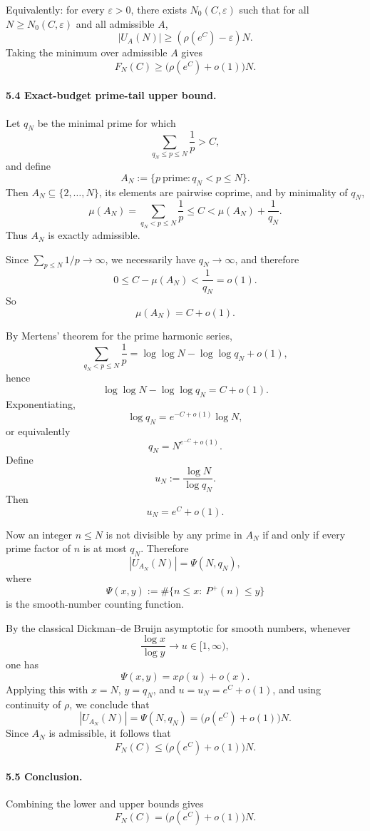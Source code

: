 Equivalently: for every \(\varepsilon>0\), there exists \(N_0(C,\varepsilon)\) such that for all \(N\ge N_0(C,\varepsilon)\) and all admissible \(A\),
\[
|U_A(N)|\ge (\rho(e^C)-\varepsilon)N.
\]
Taking the minimum over admissible \(A\) gives
\[
F_N(C)\ge \bigl(\rho(e^C)+o(1)\bigr)N.
\]

\paragraph{5.4 Exact-budget prime-tail upper bound.}

Let \(q_N\) be the minimal prime for which
\[
\sum_{q_N\le p\le N}\frac1p>C,
\]
and define
\[
A_N:=\{p\ \mbox{prime}: q_N<p\le N\}.
\]
Then \(A_N\subseteq\{2,\dots,N\}\), its elements are pairwise coprime, and by minimality of \(q_N\),
\[
\mu(A_N)=\sum_{q_N<p\le N}\frac1p\le C<\mu(A_N)+\frac1{q_N}.
\]
Thus \(A_N\) is exactly admissible.

Since \(\sum_{p\le N}1/p\to\infty\), we necessarily have \(q_N\to\infty\), and therefore
\[
0\le C-\mu(A_N)<\frac1{q_N}=o(1).
\]
So
\[
\mu(A_N)=C+o(1).
\]

By Mertens' theorem for the prime harmonic series,
\[
\sum_{q_N<p\le N}\frac1p
=
\log\log N-\log\log q_N+o(1),
\]
hence
\[
\log\log N-\log\log q_N=C+o(1).
\]
Exponentiating,
\[
\log q_N=e^{-C+o(1)}\log N,
\]
or equivalently
\[
q_N=N^{e^{-C}+o(1)}.
\]
Define
\[
u_N:=\frac{\log N}{\log q_N}.
\]
Then
\[
u_N=e^C+o(1).
\]

Now an integer \(n\le N\) is not divisible by any prime in \(A_N\) if and only if every prime factor of \(n\) is at most \(q_N\).  Therefore
\[
|U_{A_N}(N)|=\Psi(N,q_N),
\]
where
\[
\Psi(x,y):=\#\{n\le x:\ P^+(n)\le y\}
\]
is the smooth-number counting function.

By the classical Dickman--de Bruijn asymptotic for smooth numbers, whenever
\[
\frac{\log x}{\log y}\to u\in[1,\infty),
\]
one has
\[
\Psi(x,y)=x\rho(u)+o(x).
\]
Applying this with \(x=N\), \(y=q_N\), and \(u=u_N=e^C+o(1)\), and using continuity of \(\rho\), we conclude that
\[
|U_{A_N}(N)|=\Psi(N,q_N)=\bigl(\rho(e^C)+o(1)\bigr)N.
\]
Since \(A_N\) is admissible, it follows that
\[
F_N(C)\le \bigl(\rho(e^C)+o(1)\bigr)N.
\]

\paragraph{5.5 Conclusion.}

Combining the lower and upper bounds gives
\[
F_N(C)=\bigl(\rho(e^C)+o(1)\bigr)N.
\]

